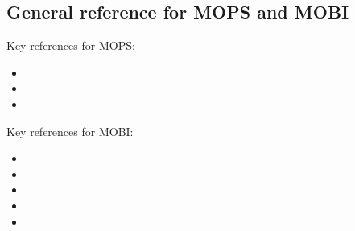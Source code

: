 \documentclass[a4paper]{article}
\def\noin{\noindent }
\begin{document}
\subsection{General reference for MOPS and MOBI}
\noin Key references for MOPS:
\begin{itemize}
\item {}
\item {}
\item {}
\end{itemize}

\noin Key references for MOBI:
\begin{itemize}
\item {}
\item {}
\item {}
\item {}
\item {}
\end{itemize}
\end{document}
